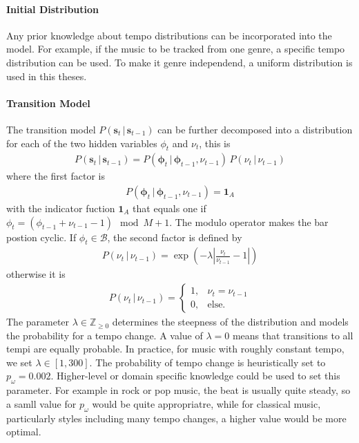 \documentclass{scrartcl}
\begin{document}
\paragraph{Initial Distribution} 
Any prior knowledge about tempo distributions can be incorporated into the model. For example, if the music to be tracked from one genre, a specific tempo distribution can be used. To make it genre independend, a uniform distribution is used in this theses. 


\paragraph{Transition Model} The transition model $P(\mathbf s_t\,|\,\mathbf s_{t-1})$ can be further decomposed into a distribution for each of the two hidden variables $\phi_t$ and $\nu_t$, this is
\begin{align}
P(\mathbf s_t\,|\,\mathbf s_{t-1}) = P(\mathbf \phi_t\,|\,\mathbf \phi_{t-1}, \nu_{t-1}) \, P(\nu_t \, |\, \nu_{t-1}) 
\end{align} 
where the first factor is
\begin{align}
P(\mathbf \phi_t\,|\,\mathbf \phi_{t-1}, \nu_{t-1}) = \mathbf 1_A
\end{align} 
with the indicator fuction $\mathbf 1_A$ that equals one if $\phi_t = (\phi_{t-1}+\nu_{t-1}-1)\mod M+1$. The modulo operator makes the bar postion cyclic. If $\phi_t \in \mathcal B$, the second factor is defined by
\begin{align}
P(\nu_t \, |\, \nu_{t-1}) = \exp \left( -\lambda \left| \frac{\nu_{t}}{\nu_{t-1}} -1 \right| \right)
\end{align} 
otherwise it is
\begin{align}
P(\nu_t \, |\, \nu_{t-1}) = \begin{cases}
    1, &\nu_t = \nu_{t-1}\\
    0, &\text{else.} 
\end{cases}
\end{align} 
The parameter $\lambda \in \mathbb Z_{\geq0}$ determines the steepness of the distribution and models the probability for a tempo change. A value of $\lambda = 0$ means that transitions to all tempi are equally probable. In practice, for music with roughly constant tempo, we set $\lambda \in [1, 300]$. The probability of tempo change is heuristically set to $p_\omega = 0.002$. Higher-level or domain specific knowledge could be used to set this parameter. For example in rock or pop music, the beat is usually quite steady, so a samll value for $p_\omega$ would be quite appropriatre, while for classical music, particularly styles including many tempo changes, a higher value would be more optimal.
\end{document}
